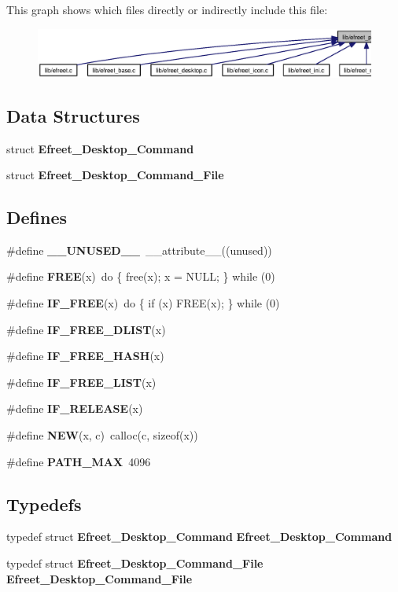 This graph shows which files directly or indirectly include this file:\nopagebreak
\begin{figure}[H]
\begin{center}
\leavevmode
\includegraphics[width=420pt]{efreet__private_8h__dep__incl}
\end{center}
\end{figure}
\subsection*{Data Structures}
\begin{CompactItemize}
\item 
struct {\bf Efreet\_\-Desktop\_\-Command}
\item 
struct {\bf Efreet\_\-Desktop\_\-Command\_\-File}
\end{CompactItemize}
\subsection*{Defines}
\begin{CompactItemize}
\item 
\#define {\bf \_\-\_\-UNUSED\_\-\_\-}~\_\-\_\-attribute\_\-\_\-((unused))
\item 
\#define {\bf FREE}(x)~do \{ free(x); x = NULL; \} while (0)
\item 
\#define {\bf IF\_\-FREE}(x)~do \{ if (x) FREE(x); \} while (0)
\item 
\#define {\bf IF\_\-FREE\_\-DLIST}(x)
\item 
\#define {\bf IF\_\-FREE\_\-HASH}(x)
\item 
\#define {\bf IF\_\-FREE\_\-LIST}(x)
\item 
\#define {\bf IF\_\-RELEASE}(x)
\item 
\#define {\bf NEW}(x, c)~calloc(c, sizeof(x))
\item 
\#define {\bf PATH\_\-MAX}~4096
\end{CompactItemize}
\subsection*{Typedefs}
\begin{CompactItemize}
\item 
typedef struct {\bf Efreet\_\-Desktop\_\-Command} {\bf Efreet\_\-Desktop\_\-Command}
\item 
typedef struct {\bf Efreet\_\-Desktop\_\-Command\_\-File} {\bf Efreet\_\-Desktop\_\-Command\_\-File}
\end{CompactItemize}
